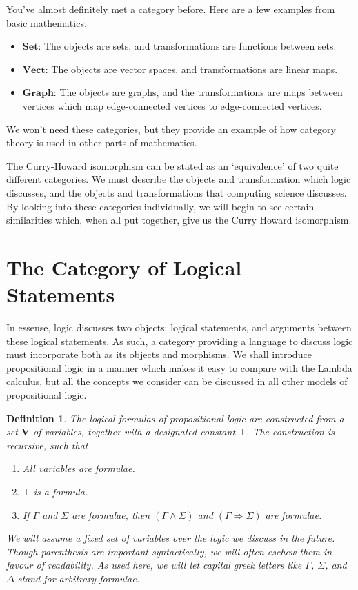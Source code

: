 \documentclass{article}
\theoremstyle{plain}
\newtheorem{definition}{Definition}
\begin{document}
You've almost definitely met a category before. Here are a few examples from basic mathematics.
%
\begin{itemize}
    \item $\mathbf{Set}$: The objects are sets, and transformations are functions between sets.
    \item $\mathbf{Vect}$: The objects are vector spaces, and transformations are linear maps.
    \item $\mathbf{Graph}$: The objects are graphs, and the transformations are maps between vertices which map edge-connected vertices to edge-connected vertices.
\end{itemize}
%
We won't need these categories, but they provide an example of how category theory is used in other parts of mathematics.

The Curry-Howard isomorphism can be stated as an `equivalence' of two quite different categories. We must describe the objects and transformation which logic discusses, and the objects and transformations that computing science discusses. By looking into these categories individually, we will begin to see certain similarities which, when all put together, give us the Curry Howard isomorphism.

\section{The Category of Logical Statements}

In essense, logic discusses two objects: logical statements, and arguments between these logical statements. As such, a category providing a language to discuss logic must incorporate both as its objects and morphisms. We shall introduce propositional logic in a manner which makes it easy to compare with the Lambda calculus, but all the concepts we consider can be discussed in all other models of propositional logic.

\begin{definition}
    The logical formulas of propositional logic are constructed from a set $\mathbf{V}$ of variables, together with a designated constant $\top$. The construction is recursive, such that
    \begin{enumerate}
        \item All variables are formulae.
        \item $\top$ is a formula.
        \item If $\Gamma$ and $\Sigma$ are formulae, then $(\Gamma \wedge \Sigma)$ and $(\Gamma \Rightarrow \Sigma)$ are formulae.
    \end{enumerate}
    We will assume a fixed set of variables over the logic we discuss in the future. Though parenthesis are important syntactically, we will often eschew them in favour of readability. As used here, we will let capital greek letters like $\Gamma$, $\Sigma$, and $\Delta$ stand for arbitrary formulae.
\end{definition}
\end{document}
